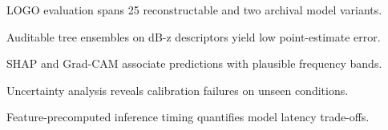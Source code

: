 \begin{highlights}
    \item LOGO evaluation spans 25 reconstructable and two archival model variants.
    \item Auditable tree ensembles on dB-z descriptors yield low point-estimate error.
    \item SHAP and Grad-CAM associate predictions with plausible frequency bands.
    \item Uncertainty analysis reveals calibration failures on unseen conditions.
    \item Feature-precomputed inference timing quantifies model latency trade-offs.
\end{highlights}
